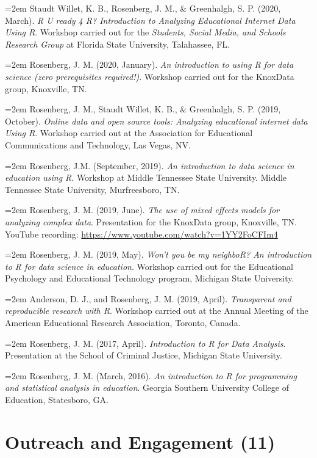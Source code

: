 \documentclass[
  14,
]{article}
\begin{document}
\hangindent=2em Staudt Willet, K. B., Rosenberg, J. M., \& Greenhalgh,
S. P. (2020, March). \emph{R U ready 4 R? Introduction to Analyzing
Educational Internet Data Using R}. Workshop carried out for the
\emph{Students, Social Media, and Schools Research Group} at Florida
State University, Talahassee, FL.

\hangindent=2em Rosenberg, J. M. (2020, January). \emph{An introduction
to using R for data science (zero prerequisites required!)}. Workshop
carried out for the KnoxData group, Knoxville, TN.

\hangindent=2em Rosenberg, J. M., Staudt Willet, K. B., \& Greenhalgh,
S. P. (2019, October). \emph{Online data and open source tools:
Analyzing educational internet data Using R}. Workshop carried out at
the Association for Educational Communications and Technology, Las
Vegas, NV.

\hangindent=2em Rosenberg, J.M. (September, 2019). \emph{An introduction
to data science in education using R}. Workshop at Middle Tennessee
State University. Middle Tennessee State University, Murfreesboro, TN.

\hangindent=2em Rosenberg, J. M. (2019, June). \emph{The use of mixed
effects models for analyzing complex data}. Presentation for the
KnoxData group, Knoxville, TN. YouTube recording:
\url{https://www.youtube.com/watch?v=1YY2FoCFIm4}

\hangindent=2em Rosenberg, J. M. (2019, May). \emph{Won't you be my
neighboR? An introduction to R for data science in education}. Workshop
carried out for the Educational Psychology and Educational Technology
program, Michigan State University.

\hangindent=2em Anderson, D. J., and Rosenberg, J. M. (2019, April).
\emph{Transparent and reproducible research with R}. Workshop carried
out at the Annual Meeting of the American Educational Research
Association, Toronto, Canada.

\hangindent=2em Rosenberg, J. M. (2017, April). \emph{Introduction to R
for Data Analysis}. Presentation at the School of Criminal Justice,
Michigan State University.

\hangindent=2em Rosenberg, J. M. (March, 2016). \emph{An introduction to
R for programming and statistical analysis in education}. Georgia
Southern University College of Education, Statesboro, GA.

\hypertarget{outreach-and-engagement-11}{%
\section{Outreach and Engagement
(11)}\label{outreach-and-engagement-11}}
\end{document}
